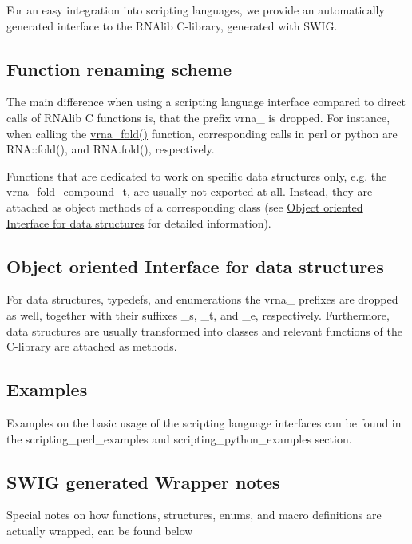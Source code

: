 For an easy integration into scripting languages, we provide an automatically generated interface to the R\+N\+Alib C-\/library, generated with S\+W\+IG.\hypertarget{wrappers_scripting_renaming}{}\subsection{Function renaming scheme}\label{wrappers_scripting_renaming}
The main difference when using a scripting language interface compared to direct calls of R\+N\+Alib C functions is, that the prefix \textquotesingle{}vrna\+\_\+\textquotesingle{} is dropped. For instance, when calling the \hyperlink{group__mfe__global_ga29a33b2895f4e67b0480271ff289afdc}{vrna\+\_\+fold()} function, corresponding calls in perl or python are R\+N\+A\+::fold(), and R\+N\+A.\+fold(), respectively.

Functions that are dedicated to work on specific data structures only, e.\+g. the \hyperlink{group__fold__compound_ga1b0cef17fd40466cef5968eaeeff6166}{vrna\+\_\+fold\+\_\+compound\+\_\+t}, are usually not exported at all. Instead, they are attached as object methods of a corresponding class (see \hyperlink{wrappers_scripting_oo_interface}{Object oriented Interface for data structures} for detailed information).\hypertarget{wrappers_scripting_oo_interface}{}\subsection{Object oriented Interface for data structures}\label{wrappers_scripting_oo_interface}
For data structures, typedefs, and enumerations the \textquotesingle{}vrna\+\_\+\textquotesingle{} prefixes are dropped as well, together with their suffixes \textquotesingle{}\+\_\+s\textquotesingle{}, \textquotesingle{}\+\_\+t\textquotesingle{}, and \textquotesingle{}\+\_\+e\textquotesingle{}, respectively. Furthermore, data structures are usually transformed into classes and relevant functions of the C-\/library are attached as methods.\hypertarget{wrappers_scripting_examples}{}\subsection{Examples}\label{wrappers_scripting_examples}
Examples on the basic usage of the scripting language interfaces can be found in the scripting\+\_\+perl\+\_\+examples and scripting\+\_\+python\+\_\+examples section.\hypertarget{wrappers_scripting_wrapper_notes}{}\subsection{S\+W\+I\+G generated Wrapper notes}\label{wrappers_scripting_wrapper_notes}
Special notes on how functions, structures, enums, and macro definitions are actually wrapped, can be found below


